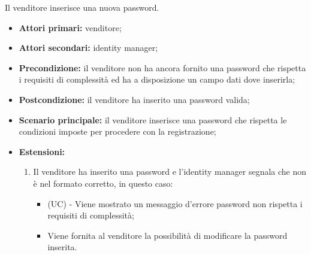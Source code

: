 Il venditore inserisce una nuova password.
\begin{itemize}
	\item \textbf{Attori primari:} venditore;
	\item \textbf{Attori secondari:} identity manager;
	\item \textbf{Precondizione:} il venditore non ha ancora fornito una password che rispetta i requisiti di complessità ed ha a disposizione un campo dati dove inserirla;
	\item \textbf{Postcondizione:} il venditore ha inserito una password valida;
	\item \textbf{Scenario principale:} il venditore inserisce una password che rispetta le condizioni imposte per procedere con la registrazione;
	\item \textbf{Estensioni:}
	\begin{enumerate}[label=\lett]
		\item Il venditore ha inserito una password e l'identity manager segnala che non è nel formato corretto, in questo caso:
		\begin{itemize}
			\item (UC) - Viene mostrato un messaggio d'errore password non rispetta i requisiti di complessità;
			\item Viene fornita al venditore la possibilità di modificare la password inserita.
		\end{itemize}
	\end{enumerate} 
\end{itemize}

